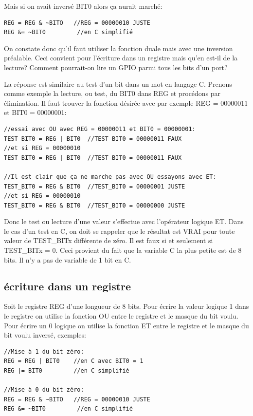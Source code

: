 Mais si on avait inversé BIT0 alors ça aurait marché:

\lstset{style=customc}
\begin{lstlisting}
REG = REG & ~BITO   //REG = 00000010 JUSTE 
REG &= ~BIT0         //en C simplifié
\end{lstlisting}

On constate donc qu'il faut utiliser la fonction duale mais avec une inversion préalable. Ceci convient pour l'écriture dans un registre mais qu'en est-il de la lecture? Comment pourrait-on lire un GPIO parmi tous les bits d'un port?

La réponse est similaire au test d'un bit dans un mot en langage C. Prenons comme exemple la lecture, ou test, du BIT0 dans REG et procédons par élimination. Il faut trouver la fonction désirée avec par exemple REG = 00000011 et BIT0 = 00000001:

\lstset{style=customc}
\begin{lstlisting}
//essai avec OU avec REG = 00000011 et BIT0 = 00000001:
TEST_BIT0 = REG | BIT0  //TEST_BIT0 = 00000011 FAUX
//et si REG = 00000010
TEST_BIT0 = REG | BIT0  //TEST_BIT0 = 00000011 FAUX

//Il est clair que ça ne marche pas avec OU essayons avec ET:
TEST_BIT0 = REG & BIT0  //TEST_BIT0 = 00000001 JUSTE
//et si REG = 00000010
TEST_BIT0 = REG & BIT0  //TEST_BIT0 = 00000000 JUSTE
\end{lstlisting}

Donc le test ou lecture d'une valeur s'effectue avec l'opérateur logique ET. Dans le cas d'un test en C, on doit se rappeler que le résultat est VRAI pour toute valeur de TEST\_BITx différente de zéro. Il est faux si et seulement si TEST\_BITx = 0. Ceci provient du fait que la variable C la plus petite est de 8 bits. Il n'y a pas de variable de 1 bit en C. 

\subsection{écriture dans un registre}

Soit le registre REG d'une longueur de 8 bits. Pour écrire la valeur logique 1 dans le registre on utilise la fonction OU entre le registre et le masque du bit voulu. Pour écrire un 0 logique on utilise la fonction ET entre le registre et le masque du bit voulu inversé, exemples:

\lstset{style=customc}
\begin{lstlisting}
//Mise à 1 du bit zéro:
REG = REG | BIT0    //en C avec BIT0 = 1
REG |= BIT0		    //en C simplifié

//Mise à 0 du bit zéro:
REG = REG & ~BITO   //REG = 00000010 JUSTE 
REG &= ~BIT0         //en C simplifié
\end{lstlisting}

